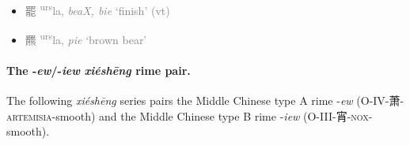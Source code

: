 \begin{itemize}
   \item {\textcolor{gray}{  {\Large{罷}} %
    {\large{{\textsuperscript{urs}}la}},
    \textit{beaX, bie} `finish' (vt)}} %

  \item {\textcolor{gray}{  {\Large{羆}} %
    {\large{{\textsuperscript{urs}}la}},
    \textit{pie} `brown bear'}} %


\end{itemize}



\paragraph{The -\textit{ew}/-\textit{iew} \textit{xiéshēng} rime pair.}
\label{par:ew-iew-XS-pair}

The following \textit{xiéshēng} series pairs the Middle Chinese type A rime -\textit{ew} (O-IV-萧-\textsc{artemisia}-smooth) and the Middle Chinese type B rime -\textit{iew} (O-III-宵-\textsc{nox}-smooth). 


%


